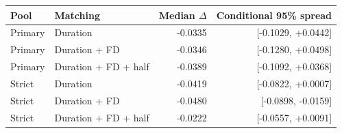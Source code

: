 \begin{tabular}{llrr}
\toprule
Pool & Matching & Median $\Delta$ & Conditional 95\% spread \\
\midrule
Primary & Duration & -0.0335 & [-0.1029, +0.0442] \\
Primary & Duration + FD & -0.0346 & [-0.1280, +0.0498] \\
Primary & Duration + FD + half & -0.0389 & [-0.1092, +0.0368] \\
Strict & Duration & -0.0419 & [-0.0822, +0.0007] \\
Strict & Duration + FD & -0.0480 & [-0.0898, -0.0159] \\
Strict & Duration + FD + half & -0.0222 & [-0.0557, +0.0091] \\
\bottomrule
\end{tabular}
